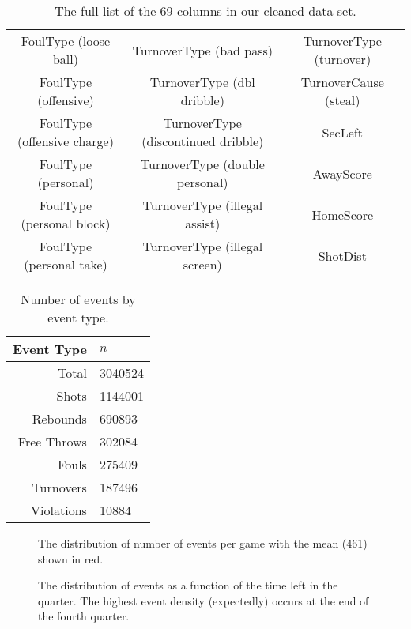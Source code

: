 \begin{table}[p]
\begin{tabular}{ccc}
		FoulType (loose ball)       & TurnoverType (bad pass)             & TurnoverType (turnover)                \\
		FoulType (offensive)        & TurnoverType (dbl dribble)          & TurnoverCause (steal)                  \\
		FoulType (offensive charge) & TurnoverType (discontinued dribble) & SecLeft                                \\
		FoulType (personal)         & TurnoverType (double personal)      & AwayScore                              \\
		FoulType (personal block)   & TurnoverType (illegal assist)       & HomeScore                              \\
		FoulType (personal take)    & TurnoverType (illegal screen)       & ShotDist
	\end{tabular}
	\caption{The full list of the 69 columns in our cleaned data set.}
	\label{tbl:list-of-columns}
\end{table}

\begin{table}
	\centering
	\begin{tabular}{rl}
		\hline
		Event Type  & $n$     \\
		\hline
		Total       & 3040524 \\
		Shots       & 1144001 \\
		Rebounds    & 690893  \\
		Free Throws & 302084  \\
		Fouls       & 275409  \\
		Turnovers   & 187496  \\
		Violations  & 10884   \\
		\hline
	\end{tabular}
	\caption{Number of events by event type.}
	\label{tbl:events-by-type}
\end{table}

\begin{figure}
	\centering
	
	\caption{The distribution of number of events per game with the mean (461) shown in red.}
	\label{fig:events-per-game}
\end{figure}

\begin{figure}
	\centering
	
	\caption{The distribution of events as a function of the time left in the quarter. The highest event density (expectedly) occurs at the end of the fourth quarter.}
	\label{fig:events-by-time}
\end{figure}
